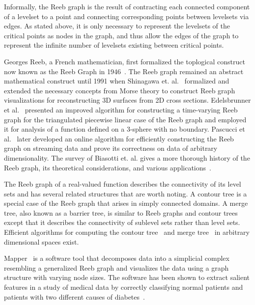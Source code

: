 Informally, the Reeb graph is the result of contracting each connected component of a levelset to a point and connecting corresponding points between levelsets via edges.
%
As stated above, it is only necessary to represent the levelsets of the critical points as nodes in the graph, and thus allow the edges of the graph to represent the infinite number of levelsets existing between critical points.

Georges Reeb, a French mathematician, first formalized the toplogical construct now known as the Reeb Graph in 1946~\cite{Reeb1946}.
%
The Reeb graph remained an abstract mathematical construct until 1991 when Shinagawa et. al.~\cite{ShinagawaKuniiKergosien1991} formalized and extended the necessary concepts from Morse theory to construct Reeb graph visualizations for reconstructing 3D surfaces from 2D cross sections.
%
Edelsbrunner et al.~\cite{EdelsbrunnerHarerMascarenhas2008} presented an improved algorithm for constructing a time-varying Reeb graph for the triangulated piecewise linear case of the Reeb graph and employed it for analysis of a function defined on a 3-sphere with no boundary.
%
Pascucci et al.~\cite{PascucciScorzelliBremer2007} later developed an online algorithm for efficiently constructing the Reeb graph on streaming data and prove its correctness on data of arbitrary dimensionality.
%
The survey of Biasotti et. al. gives a more thorough history of the Reeb graph, its theoretical considerations, and various applications~\cite{BiasottiGiorgiSpagnuolo2008}.


The Reeb graph of a real-valued function describes the connectivity of its level sets and has several related structures that are worth noting.
%
A contour tree is a special case of the Reeb graph that arises in simply connected domains.
%
A merge tree, also known as a barrier tree, is similar to Reeb graphs and contour trees except that it describes the connectivity of sublevel sets rather than level sets.
%
Efficient algorithms for computing the contour tree~\cite{CarrSnoeyinkAxen2003,ChiangLenzLu2005} and merge tree~\cite{OesterlingHeineWeber2015} in arbitrary dimensional spaces exist.

Mapper~\cite{SinghMemoliCarlsson2007} is a software tool that decomposes data into a simplicial complex resembling a generalized Reeb graph and visualizes the data using a graph structure with varying node sizes.
%
The software has been shown to extract salient features in a study of medical data by correctly classifying normal patients and patients with two different causes of diabetes~\cite{SarikondaPettusPhatak2014}.

